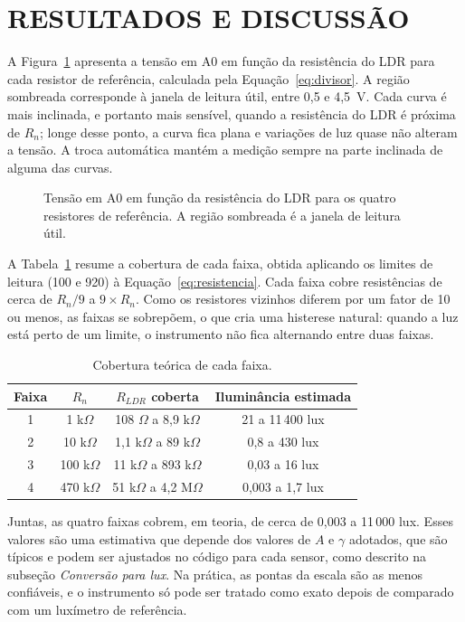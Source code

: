 \documentclass[11pt,a4paper]{article}
\begin{document}
\section*{RESULTADOS E DISCUSSÃO}

A Figura~\ref{fig:divisor} apresenta a tensão em A0 em função da resistência do LDR para cada resistor de referência, calculada pela Equação~\ref{eq:divisor}. A região sombreada corresponde à janela de leitura útil, entre 0,5 e 4,5~V. Cada curva é mais inclinada, e portanto mais sensível, quando a resistência do LDR é próxima de $R_n$; longe desse ponto, a curva fica plana e variações de luz quase não alteram a tensão. A troca automática mantém a medição sempre na parte inclinada de alguma das curvas.

\begin{figure}[htbp]
	\centering
	
	\caption{Tensão em A0 em função da resistência do LDR para os quatro resistores de referência. A região sombreada é a janela de leitura útil.}
	\label{fig:divisor}
\end{figure}

A Tabela~\ref{tab:faixas} resume a cobertura de cada faixa, obtida aplicando os limites de leitura (100 e 920) à Equação~\ref{eq:resistencia}. Cada faixa cobre resistências de cerca de $R_n/9$ a $9 \times R_n$. Como os resistores vizinhos diferem por um fator de 10 ou menos, as faixas se sobrepõem, o que cria uma histerese natural: quando a luz está perto de um limite, o instrumento não fica alternando entre duas faixas.

\begin{table}[H]
	\centering
	\caption{Cobertura teórica de cada faixa.}
	\label{tab:faixas}
	\small
	\begin{tabular}{cccc}
		\toprule
		Faixa & $R_n$ & $R_{LDR}$ coberta & Iluminância estimada \\
		\midrule
		1 & 1 k$\Omega$ & 108 $\Omega$ a 8,9 k$\Omega$ & 21 a 11\,400 lux \\
		2 & 10 k$\Omega$ & 1,1 k$\Omega$ a 89 k$\Omega$ & 0,8 a 430 lux \\
		3 & 100 k$\Omega$ & 11 k$\Omega$ a 893 k$\Omega$ & 0,03 a 16 lux \\
		4 & 470 k$\Omega$ & 51 k$\Omega$ a 4,2 M$\Omega$ & 0,003 a 1,7 lux \\
		\bottomrule
	\end{tabular}
\end{table}

Juntas, as quatro faixas cobrem, em teoria, de cerca de 0,003 a 11\,000 lux. Esses valores são uma estimativa que depende dos valores de $A$ e $\gamma$ adotados, que são típicos e podem ser ajustados no código para cada sensor, como descrito na subseção \textit{Conversão para lux}. Na prática, as pontas da escala são as menos confiáveis, e o instrumento só pode ser tratado como exato depois de comparado com um luxímetro de referência.
\end{document}
